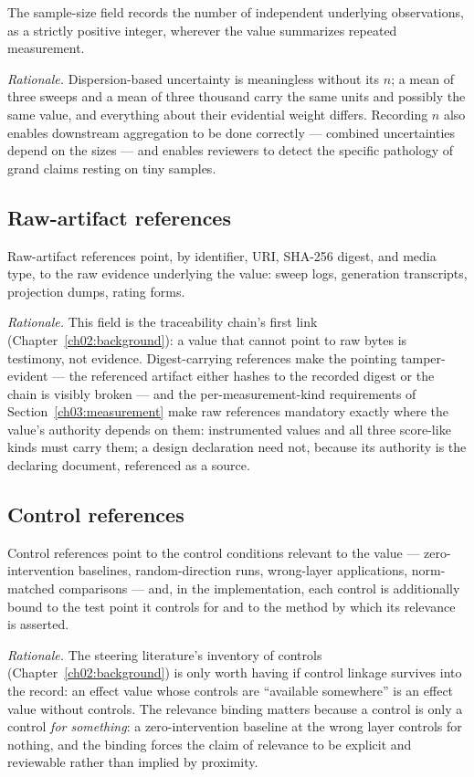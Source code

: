The sample-size field records the number of independent underlying observations, as a strictly positive integer, wherever the value summarizes repeated measurement.

\emph{Rationale.} Dispersion-based uncertainty is meaningless without its $n$; a mean of three sweeps and a mean of three thousand carry the same units and possibly the same value, and everything about their evidential weight differs. Recording $n$ also enables downstream aggregation to be done correctly --- combined uncertainties depend on the sizes --- and enables reviewers to detect the specific pathology of grand claims resting on tiny samples.

\subsection{Raw-artifact references}\label{ch03:field:raw}

Raw-artifact references point, by identifier, URI, SHA-256 digest, and media type, to the raw evidence underlying the value: sweep logs, generation transcripts, projection dumps, rating forms.

\emph{Rationale.} This field is the traceability chain's first link (Chapter~\ref{ch02:background}): a value that cannot point to raw bytes is testimony, not evidence. Digest-carrying references make the pointing tamper-evident --- the referenced artifact either hashes to the recorded digest or the chain is visibly broken --- and the per-measurement-kind requirements of Section~\ref{ch03:measurement} make raw references mandatory exactly where the value's authority depends on them: instrumented values and all three score-like kinds must carry them; a design declaration need not, because its authority is the declaring document, referenced as a source.

\subsection{Control references}\label{ch03:field:controls}

Control references point to the control conditions relevant to the value --- zero-intervention baselines, random-direction runs, wrong-layer applications, norm-matched comparisons --- and, in the implementation, each control is additionally bound to the test point it controls for and to the method by which its relevance is asserted.

\emph{Rationale.} The steering literature's inventory of controls (Chapter~\ref{ch02:background}) is only worth having if control linkage survives into the record: an effect value whose controls are ``available somewhere'' is an effect value without controls. The relevance binding matters because a control is only a control \emph{for something}: a zero-intervention baseline at the wrong layer controls for nothing, and the binding forces the claim of relevance to be explicit and reviewable rather than implied by proximity.

